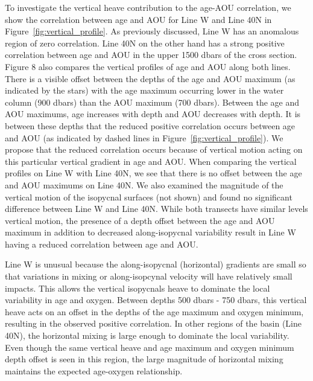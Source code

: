 To investigate the vertical heave contribution to the age-AOU correlation, we show
the correlation between age and AOU for Line W and Line 40N in Figure~\ref{fig:vertical_profile}.
As previously discussed, Line W has an anomalous region of zero correlation.
Line 40N on the other hand has a strong positive correlation between age and AOU
in the upper 1500 dbars of the cross section. Figure 8 also compares the vertical
profiles of age and AOU along both lines. There is a visible offset between the
depths of the age and AOU maximum (as indicated by the stars) with the age
maximum occurring lower in the water column (900 dbars) than the AOU maximum
(700 dbars). Between the age and AOU maximums, age increases with depth and AOU
decreases with depth. It is between these depths that the reduced positive
correlation occurs between age and AOU (as indicated by dashed lines in
Figure~\ref{fig:vertical_profile}). We propose that the reduced correlation occurs
because of vertical motion acting on this particular vertical gradient in age and
AOU. When comparing the vertical profiles on Line W with Line 40N, we see that
there is no offset between the age and AOU maximums on Line 40N. We also examined
the magnitude of the vertical motion of the isopycnal surfaces (not shown) and
found no significant difference between Line W and Line 40N. While both transects
have similar levels vertical motion, the presence of a depth offset between the age
and AOU maximum in addition to decreased along-isopycnal variability result in
Line W having a reduced correlation between age and AOU.

Line W is unusual because the along-isopycnal (horizontal) gradients are small so
that variations in mixing or along-isopcynal velocity will have relatively small
impacts. This allows the vertical isopycnals heave to dominate the local
variability in age and oxygen. Between depths 500 dbars - 750 dbars, this vertical
heave acts on an offset in the depths of the age maximum and oxygen minimum,
resulting in the observed positive correlation. In other regions of the basin
(Line 40N), the horizontal mixing is large enough to dominate the local variability.
Even though the same vertical heave and age maximum and oxygen minimum depth
offset is seen in this region, the large magnitude of horizontal mixing maintains
the expected age-oxygen relationship.



